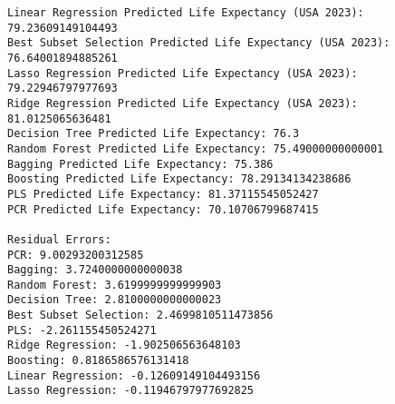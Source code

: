 \documentclass[11pt]{article}
\begin{document}
    \begin{Verbatim}[commandchars=\\\{\}]
Linear Regression Predicted Life Expectancy (USA 2023): 79.23609149104493
Best Subset Selection Predicted Life Expectancy (USA 2023): 76.64001894885261
Lasso Regression Predicted Life Expectancy (USA 2023): 79.22946797977693
Ridge Regression Predicted Life Expectancy (USA 2023): 81.0125065636481
Decision Tree Predicted Life Expectancy: 76.3
Random Forest Predicted Life Expectancy: 75.49000000000001
Bagging Predicted Life Expectancy: 75.386
Boosting Predicted Life Expectancy: 78.29134134238686
PLS Predicted Life Expectancy: 81.37115545052427
PCR Predicted Life Expectancy: 70.10706799687415

Residual Errors:
PCR: 9.00293200312585
Bagging: 3.7240000000000038
Random Forest: 3.6199999999999903
Decision Tree: 2.8100000000000023
Best Subset Selection: 2.4699810511473856
PLS: -2.261155450524271
Ridge Regression: -1.902506563648103
Boosting: 0.8186586576131418
Linear Regression: -0.12609149104493156
Lasso Regression: -0.11946797977692825
    \end{Verbatim}
\end{document}
